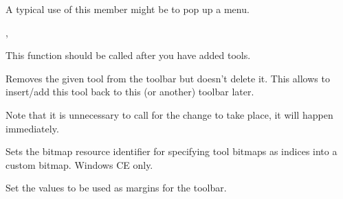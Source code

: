 


A typical use of this member might be to pop up a menu.


,\rtfsp
{}


\label{wxtoolbarrealize}


This function should be called after you have added tools.


\label{wxtoolbarremovetool}


Removes the given tool from the toolbar but doesn't delete it. This allows to
insert/add this tool back to this (or another) toolbar later.

Note that it is unnecessary to call  for the
change to take place, it will happen immediately.




\label{wxtoolbarsetbitmapresource}


Sets the bitmap resource identifier for specifying tool bitmaps as indices
into a custom bitmap. Windows CE only.


\label{wxtoolbarsetmargins}



Set the values to be used as margins for the toolbar.





